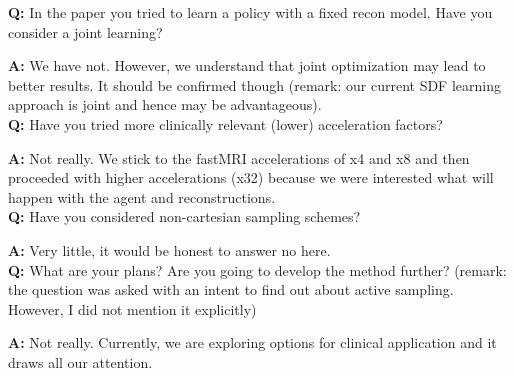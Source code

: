 \textbf{Q:} In the paper you tried to learn a policy with a fixed recon model. Have you consider a joint learning?  

\textbf{A:} We have not. However, we understand that joint optimization may lead to better results. It should be confirmed though (remark: our current SDF learning approach is joint and hence may be advantageous). \\

\textbf{Q:} Have you tried more clinically relevant (lower) acceleration factors?

\textbf{A:} Not really. We stick to the fastMRI accelerations of x4 and x8 and then proceeded with higher accelerations (x32) because we were interested what will happen with the agent and reconstructions. \\

\textbf{Q:} Have you considered non-cartesian sampling schemes?

\textbf{A:} Very little, it would be honest to answer no here. \\

\textbf{Q:} What are your plans? Are you going to develop the method further? (remark: the question was asked with an intent to find out about active sampling. However, I did not mention it explicitly) 

\textbf{A:} Not really. Currently, we are exploring options for clinical application and it draws all our attention. \\
